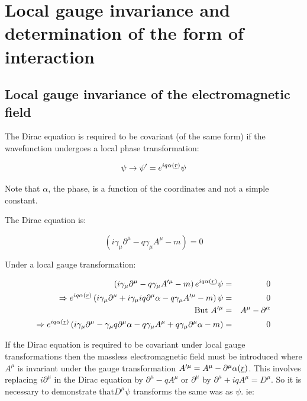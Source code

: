 
\chapter[{Local gauge invariance and the form of interaction}]{Local gauge invariance and determination of the form of interaction}

\section{Local gauge invariance of the electromagnetic field}

The Dirac equation is required to be covariant (of the same form) if the wavefunction undergoes a local phase transformation:

\[
  \psi \to \psi' = e^{iq\alpha(\underline{r})}\psi
\]

Note that $\alpha$, the phase, is a function of the coordinates and not a simple constant.

The Dirac equation is:

\[
  \left(i\gamma_{\mu}\partial^{\mu} - q\gamma_{\mu}A^{\mu} - m\right) = 0
\]

Under a local gauge transformation:

\begin{eqnarray*}
  \left(i\gamma_{\mu}\partial^{\mu} - q\gamma_{\mu}A'^{\mu} - m\right)e^{iq\alpha(\underline{r})}\psi & = & 0 \\
  \Rightarrow e^{iq\alpha(\underline{r})}\left(i\gamma_{\mu}\partial^{\mu} + i \gamma_{\mu}iq\partial^{\mu}\alpha - q\gamma_{\mu}A'^{\mu} - m\right)\psi & = & 0 \\
  \textrm{But } A'^{\mu} & = & A^{\mu} - \partial^{\alpha} \\
  \Rightarrow e^{iq\alpha(\underline{r})}\left(i\gamma_{\mu}\partial^{\mu} - \gamma_{\mu}q\partial^{\mu}\alpha - q\gamma_{\mu}A^{\mu} + q\gamma_{\mu}\partial^{\mu}\alpha - m\right) & = & 0
\end{eqnarray*}

If the Dirac equation is required to be covariant under local gauge transformations then the massless electromagnetic field must be introduced where $A^{\mu}$ is invariant under the gauge transformation $A'^{\mu} = A^{\mu} - \partial^{\mu}\alpha(\underline{r})$.  This involves replacing $i\partial^{\mu}$ in the Dirac equation by $\partial^{\mu} - qA^{\mu}$ or $\partial^{\mu}$ by $\partial^{\mu} + iqA^{\mu} = D^{\mu}$.  So it is necessary to demonstrate that$D^{\mu}\psi$ transforms the same was as $\psi$.  ie:

